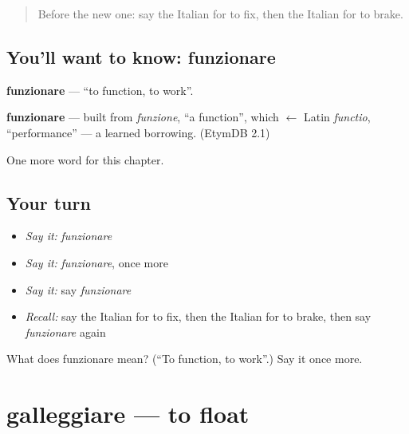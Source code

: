 \label{lesson:IT-C149-funzionare}



\begin{quote}
Before the new one: say the Italian for to fix, then the Italian for to brake.
\end{quote}

\subsection*{You'll want to know: funzionare}
\textbf{funzionare} — \textquotedblleft{}to function, to work\textquotedblright{}.

\begin{cousinweb}
\textbf{funzionare} — built from \emph{funzione}, \textquotedblleft{}a function\textquotedblright{}, which $\leftarrow$ Latin \emph{functio}, \textquotedblleft{}performance\textquotedblright{} — a learned borrowing. (EtymDB 2.1)
\end{cousinweb}

\begin{grammarlens}[title={What you've built}]
One more word for this chapter.
\end{grammarlens}

\subsection*{Your turn}
\begin{itemize}
\raggedright
  \item \emph{Say it:} \emph{funzionare}
  \item \emph{Say it:} \emph{funzionare}, once more
  \item \emph{Say it:} say \emph{funzionare}
  \item \emph{Recall:} say the Italian for to fix, then the Italian for to brake, then say \emph{funzionare} again
\end{itemize}

\begin{tcolorbox}[breakable,colback=teal!4,colframe=teal!35!black,title={Before you move on}]
What does funzionare mean? (\textquotedblleft{}To function, to work\textquotedblright{}.) Say it once more.
\end{tcolorbox}
\section[galleggiare]{galleggiare — to float}

\label{lesson:IT-C149-galleggiare}



